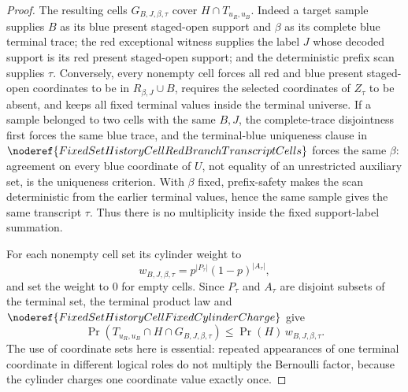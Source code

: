 \begin{proof}
The resulting cells \(G_{B,J,\beta,\tau}\) cover \(H\cap T_{u_R,u_B}\).
Indeed a target sample supplies \(B\) as its blue present staged-open support
and \(\beta\) as its complete blue terminal trace; the red exceptional
witness supplies the label \(J\) whose decoded support is its red present
staged-open support; and the deterministic prefix scan supplies \(\tau\).
Conversely, every nonempty cell forces all red and blue present staged-open
coordinates to be in \(R_{\beta,J}\cup B\), requires the selected coordinates
of \(Z_\tau\) to be absent, and keeps all fixed terminal values inside the
terminal universe.  If a sample belonged to two cells with the same \(B,J\),
the complete-trace disjointness first forces the same blue trace, and the
terminal-blue uniqueness clause in
\(\noderef{FixedSetHistoryCellRedBranchTranscriptCells}\) forces the same
\(\beta\): agreement on every blue coordinate of \(U\), not equality of an
unrestricted auxiliary set, is the uniqueness criterion.  With \(\beta\)
fixed, prefix-safety makes the scan deterministic from the earlier terminal
values, hence the same sample gives the same transcript \(\tau\).  Thus
there is no multiplicity inside the fixed support-label summation.

For each nonempty cell set its cylinder weight to
\[
w_{B,J,\beta,\tau}=
p^{|P_\tau|}(1-p)^{|A_\tau|},
\]
and set the weight to \(0\) for empty cells.  Since \(P_\tau\) and
\(A_\tau\) are disjoint subsets of the terminal set, the terminal product law
and \(\noderef{FixedSetHistoryCellFixedCylinderCharge}\) give
\[
\Pr(T_{u_R,u_B}\cap H\cap G_{B,J,\beta,\tau})
\le
\Pr(H)\,w_{B,J,\beta,\tau}.
\]
The use of coordinate sets here is essential: repeated appearances of one
terminal coordinate in different logical roles do not multiply the Bernoulli
factor, because the cylinder charges one coordinate value exactly once.


\end{proof}
